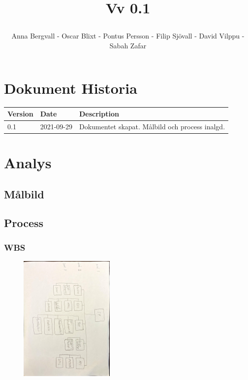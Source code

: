\documentclass{article}
\date {#1}
\title {
    \documentNumber {01}    

    \documentTitle {Helsingborg Event and Convention Bureau}
    
    \documentDate {2021-09-29}
    \documentVersion Vv 0.1
    
    \author{Anna Bergvall - Oscar Blixt - Pontus Persson - Filip Sjövall - David Vilppu - Sabah Zafar}
}
\begin{document}
\maketitle

\thispagestyle{empty}



\newpage

\tableofcontents


\newpage

\section{Dokument Historia}
\begin{tabular}{ l | l | l }
    Version & Date & Description \\
    \hline
    0.1 & 2021-09-29 & Dokumentet skapat. Målbild och process inalgd. \\
    \hline
   
\end{tabular}

\newpage
\section{Analys}
\subsection{Målbild}




\newpage
\subsection{Process}
\subsubsection{WBS}
\begin{figure}[htp]
    \centering
    \includegraphics[width = 175px,angle=90]{WBS.jpg}
    \label{fig:24}
\end{figure}
\end{document}
